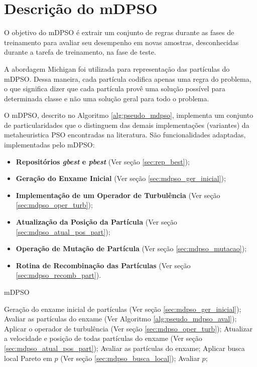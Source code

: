 \documentclass[
	12pt,				%
	openany,			%
	oneside,	
	a4paper,			%
	brazil,				%
	]{unimontes-ppgmsc-abntex2}
\begin{document}
\section{Descrição do mDPSO}
\label{sec:desc_mdpso}

O objetivo do mDPSO é extrair um conjunto de regras durante as fases de treinamento para avaliar seu desempenho em novas amostras, desconhecidas durante a tarefa de treinamento, na fase de teste.

A abordagem Michigan foi utilizada para representação das partículas do mDPSO. Dessa maneira, cada partícula codifica apenas uma regra do problema, o que significa dizer que cada partícula provê uma solução possível para determinada classe e não uma solução geral para todo o problema. 

O mDPSO, descrito no Algoritmo \ref{alg:pseudo_mdpso}, implementa um conjunto de particularidades que o distinguem das demais implementações (variantes) da metaheuristica PSO encontradas na literatura. São funcionalidades adaptadas, implementadas pelo mDPSO:

\begin{itemize}
\item \textbf{Repositórios {\em gbest} e {\em pbest}} (Ver seção \ref{sec:rep_best});
\item \textbf{Geração do Enxame Inicial} (Ver seção \ref{sec:mdpso_ger_inicial});
\item \textbf{Implementação de um Operador de Turbulência} (Ver seção \ref{sec:mdpso_oper_turb});
\item \textbf{Atualização da Posição da Partícula} (Ver seção \ref{sec:mdpso_atual_pos_part});
\item \textbf{Operação de Mutação de Partícula} (Ver seção \ref{sec:mdpso_mutacao});
\item \textbf{Rotina de Recombinação das Partículas} (Ver seção \ref{sec:mdpso_recomb_part}).
\end{itemize}

\begin{algorithm}[ht]
\caption{mDPSO}
\label{alg:pseudo_mdpso}
\begin{algorithmic}[1]
\State Geração do enxame inicial de partículas (Ver seção \ref{sec:mdpso_ger_inicial}); 
\State Avaliar as partículas do enxame (Ver Algoritmo \ref{alg:pseudo_mdpso_aval});
  \State Aplicar o operador de turbulência (Ver seção \ref{sec:mdpso_oper_turb}); 
  \State Atualizar a velocidade e posição de todas partículas do enxame (Ver seção \ref{sec:mdpso_atual_pos_part});
  \State Avaliar as partículas do enxame;    
	\State Aplicar busca local Pareto em $p$ (Ver seção \ref{sec:mdpso_busca_local});
	\State Avaliar $p$;
   \EndFor
\EndWhile
\end{algorithmic}
\end{algorithm}
\end{document}

